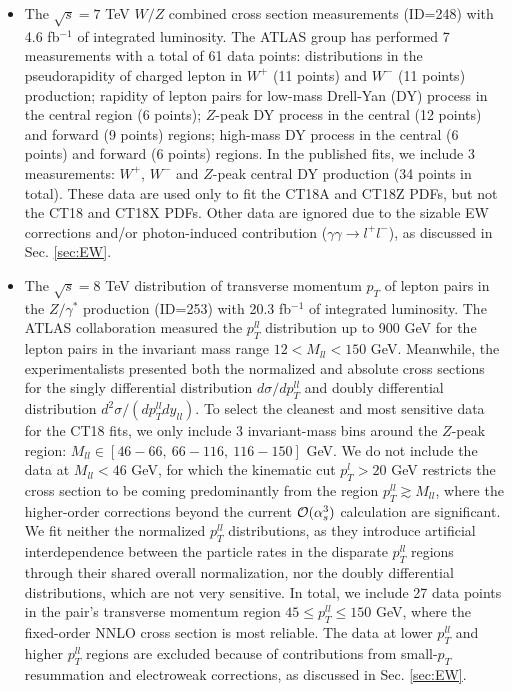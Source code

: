 \begin{itemize}
	
	\item The $\sqrt{s}=7$ TeV $W/Z$ combined cross section measurements \cite{Aaboud:2016btc} (ID=248) with 4.6 fb$^{-1}$ 
	of integrated luminosity. The ATLAS group has performed 7 measurements with a total of 61 data points: distributions in the pseudorapidity of charged lepton in $W^+$ (11 points) and $W^-$ (11 points) production; rapidity of lepton pairs for low-mass Drell-Yan (DY) process in the central region (6 points); $Z$-peak DY process in the central (12 points) and forward (9 points) regions; high-mass DY process in the central (6 points) and forward (6 points) regions. In the published fits, we include 3 measurements: $W^+$, $W^-$ and $Z$-peak central DY production (34 points in total).
	These data are used only to fit the CT18A and CT18Z PDFs, but not the CT18 and CT18X PDFs.
	Other data are ignored due to the sizable EW corrections and/or photon-induced contribution ($\gamma\gamma\to l^+l^-$), as discussed in Sec. \ref{sec:EW}.
	
		
	\item The $\sqrt{s}=8$ TeV distribution of transverse momentum $p_T$ of lepton pairs in the $Z/\gamma^*$ production (ID=253) \cite{Aad:2015auj} with 20.3 fb$^{-1}$ of integrated luminosity. The ATLAS collaboration measured the $p_T^{ll}$ distribution up to 900 GeV for the lepton pairs in the invariant mass range $12<M_{ll}<150$ GeV. Meanwhile, the experimentalists presented both the normalized and absolute cross sections for the singly differential distribution $d\sigma/d p_T^{ll}$ and doubly differential distribution $d^2\sigma/(d p_T^{ll}d y_{ll})$. To select the cleanest and most sensitive data for the CT18 fits, 
	we only include 3 invariant-mass bins around the $Z$-peak region: $M_{ll}\in[46-66,\ 66-116,\ 116-150]$ GeV. We do not include the data at $M_{ll} < 46$ GeV, for which the kinematic cut $p_T^l>20$ GeV restricts the cross section to be coming predominantly from the region $p_T^{ll} \gtrsim M_{ll}$, where the higher-order corrections beyond the current ${\cal O}(\alpha_s^3)$ calculation are significant. We fit neither the normalized $p_T^{ll}$ distributions, as they introduce artificial interdependence between the particle rates in the disparate $p_T^{ll}$ regions through their shared overall normalization, nor the doubly differential distributions, which are not very sensitive. 
	In total, we include 27 data points in the pair's transverse momentum region $45\! \leq\! p_T^{ll}\! \leq\! 150$ GeV, where the fixed-order NNLO cross section is most reliable. The data at lower $p_T^{ll}$ and higher $p_T^{ll}$ regions are excluded because of contributions from small-$p_T$ resummation and electroweak corrections, as discussed in Sec. \ref{sec:EW}.
\end{itemize}

